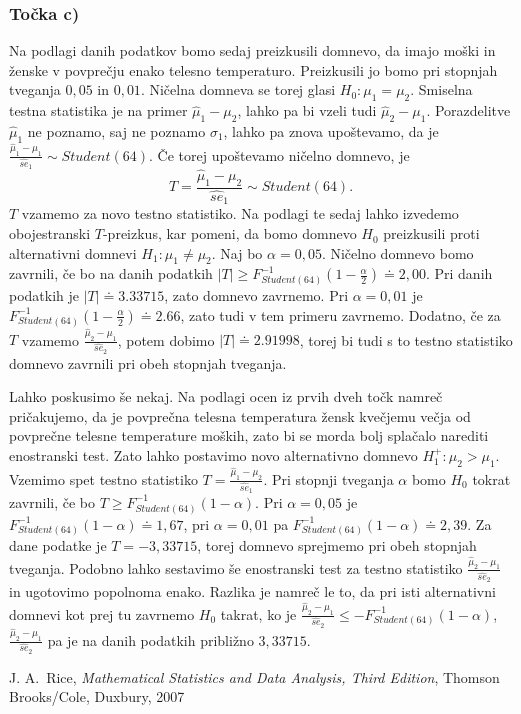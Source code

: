 \documentclass[12pt, letterpaper]{article}
\begin{document}
\subsubsection*{Točka c)} Na podlagi danih podatkov bomo sedaj preizkusili domnevo, da imajo moški in ženske v povprečju enako telesno temperaturo. Preizkusili jo bomo pri stopnjah tveganja $0,05$ in $0,01$. Ničelna domneva se torej glasi $H_0: \mu_1 = \mu_2$. Smiselna testna statistika je na primer $\hat{\mu}_1 - \mu_2$, lahko pa bi vzeli tudi $\hat{\mu}_2 - \mu_1$. Porazdelitve $\hat{\mu}_1$ ne poznamo, saj ne poznamo $\sigma_1$, lahko pa znova upoštevamo, da je $\frac{\hat{\mu}_1 - \mu_1}{\hat{se}_1} \sim Student(64)$. Če torej upoštevamo ničelno domnevo, je
\[
T = \frac{\hat{\mu}_1 - \mu_2}{\hat{se}_1} \sim Student(64).
\]
$T$ vzamemo za novo testno statistiko. Na podlagi te sedaj lahko izvedemo obojestranski $T$-preizkus, kar pomeni, da bomo domnevo $H_0$ preizkusili proti alternativni domnevi $H_1 : \mu_1 \neq \mu_2$. Naj bo $\alpha = 0,05$. Ničelno domnevo bomo zavrnili, če bo na danih podatkih $|T| \geq F^{-1}_{Student(64)}(1 - \frac{\alpha}{2}) \doteq 2,00$. Pri danih podatkih je $|T| \doteq 3.33715$, zato domnevo zavrnemo. Pri $\alpha = 0,01$ je $F^{-1}_{Student(64)}(1 - \frac{\alpha}{2}) \doteq 2.66$, zato tudi v tem primeru zavrnemo. Dodatno, če za $T$ vzamemo $\frac{\hat{\mu}_2 - \mu_1}{\hat{se}_2}$, potem dobimo $|T| \doteq 2.91998$, torej bi tudi s to testno statistiko domnevo zavrnili pri obeh stopnjah tveganja. 

Lahko poskusimo še nekaj. Na podlagi ocen iz prvih dveh točk namreč pričakujemo, da je povprečna telesna temperatura žensk kvečjemu večja od povprečne telesne temperature moških, zato bi se morda bolj splačalo narediti enostranski test. Zato lahko postavimo novo alternativno domnevo $H_1^+ : \mu_2 > \mu_1$. Vzemimo spet testno statistiko $T = \frac{\hat{\mu}_1 - \mu_2}{\hat{se}_1}$. Pri stopnji tveganja $\alpha$ bomo $H_0$ tokrat zavrnili, če bo $T \geq F^{-1}_{Student(64)}(1 - \alpha)$. Pri $\alpha = 0,05$ je $F^{-1}_{Student(64)}(1 - \alpha) \doteq 1,67$, pri $\alpha = 0,01$ pa $F^{-1}_{Student(64)}(1 - \alpha) \doteq 2,39$. Za dane podatke je $T = - 3,33715$, torej domnevo sprejmemo pri obeh stopnjah tveganja. Podobno lahko sestavimo še enostranski test za testno statistiko $\frac{\hat{\mu}_2 - \mu_1}{\hat{se}_2}$ in ugotovimo popolnoma enako. Razlika je namreč le to, da pri isti alternativni domnevi kot prej tu zavrnemo $H_0$ takrat, ko je $\frac{\hat{\mu}_2 - \mu_1}{\hat{se}_2} \leq -F^{-1}_{Student(64)}(1 - \alpha)$, $\frac{\hat{\mu}_2 - \mu_1}{\hat{se}_2}$ pa je na danih podatkih približno $3,33715$.



\begin{thebibliography}{99}
 J. A.~Rice, \emph{Mathematical Statistics and Data Analysis, Third Edition}, Thomson Brooks/Cole, Duxbury, 2007
\end{thebibliography}
\end{document}
